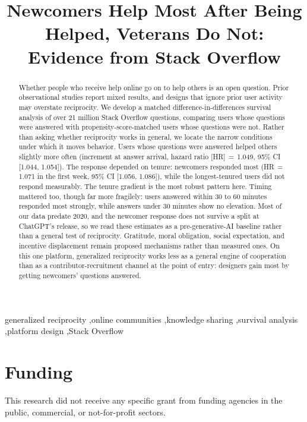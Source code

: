 \documentclass[preprint,12pt,authoryear]{elsarticle}
\begin{document}
\begin{frontmatter}

\title{Newcomers Help Most After Being Helped, Veterans Do Not: Evidence from Stack Overflow}

\begin{abstract}
\noindent Whether people who receive help online go on to help others is an open question. Prior observational studies report mixed results, and designs that ignore prior user activity may overstate reciprocity. We develop a matched difference-in-differences survival analysis of over 21 million Stack Overflow questions, comparing users whose questions were answered with propensity-score-matched users whose questions were not. Rather than asking whether reciprocity works in general, we locate the narrow conditions under which it moves behavior. Users whose questions were answered helped others slightly more often (increment at answer arrival, hazard ratio [HR]\,$=$\,1.049, 95\% CI [1.044, 1.054]). The response depended on tenure: newcomers responded most (HR\,$=$\,1.071 in the first week, 95\% CI [1.056, 1.086]), while the longest-tenured users did not respond measurably. The tenure gradient is the most robust pattern here. Timing mattered too, though far more fragilely: users answered within 30 to 60 minutes responded most strongly, while answers under 30 minutes show no elevation. Most of our data predate 2020, and the newcomer response does not survive a split at ChatGPT's release, so we read these estimates as a pre-generative-AI baseline rather than a general test of reciprocity. Gratitude, moral obligation, social expectation, and incentive displacement remain proposed mechanisms rather than measured ones. On this one platform, generalized reciprocity works less as a general engine of cooperation than as a contributor-recruitment channel at the point of entry: designers gain most by getting newcomers' questions answered.
\end{abstract}

\begin{keyword}
generalized reciprocity \sep online communities \sep knowledge sharing \sep survival analysis \sep platform design \sep Stack Overflow
\end{keyword}

\end{frontmatter}



\section*{Funding}
This research did not receive any specific grant from funding agencies in the public, commercial, or not-for-profit sectors.
\end{document}
